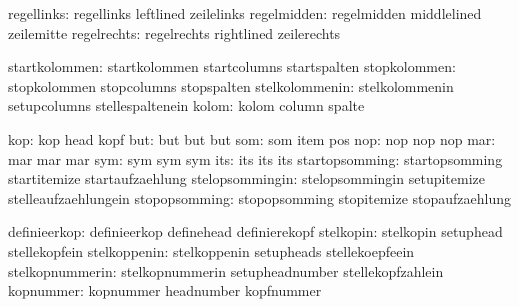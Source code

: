                    regellinks:  regellinks                   leftlined
                                zeilelinks  %
                  regelmidden:  regelmidden                  middlelined
                                zeilemitte  %
                  regelrechts:  regelrechts                  rightlined
                                zeilerechts %

                startkolommen:  startkolommen                startcolumns
                                startspalten
                 stopkolommen:  stopkolommen                 stopcolumns
                                stopspalten
               stelkolommenin:  stelkolommenin               setupcolumns
                                stellespaltenein
                        kolom:  kolom                        column
                                spalte

                          kop:  kop                          head
                                kopf
                          but:  but                          but
                                but
                          som:  som                          item
                                pos
                          nop:  nop                          nop
                                nop
                          mar:  mar                          mar
                                mar
                          sym:  sym                          sym
                                sym
                          its:  its                          its
                                its
               startopsomming:  startopsomming               startitemize
                                startaufzaehlung
              stelopsommingin:  stelopsommingin              setupitemize
                                stelleaufzaehlungein
                stopopsomming:  stopopsomming                stopitemize
                                stopaufzaehlung

                 definieerkop:  definieerkop                 definehead
                                definierekopf
                    stelkopin:  stelkopin                    setuphead
                                stellekopfein
                 stelkoppenin:  stelkoppenin                 setupheads
                                stellekoepfeein
              stelkopnummerin:  stelkopnummerin              setupheadnumber
                                stellekopfzahlein
                    kopnummer:  kopnummer                    headnumber
                                kopfnummer

